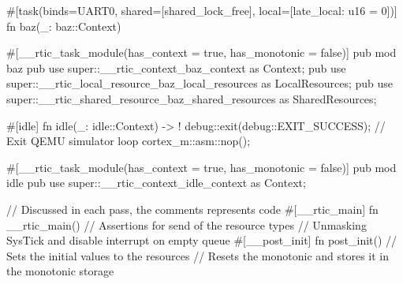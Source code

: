 {    #[task(binds=UART0, shared=[shared_lock_free], local=[late_local: u16 = 0])]
    fn baz(_: baz::Context){
    }
    
    #[__rtic_task_module(has_context = true, has_monotonic = false)]
    pub mod baz {
        pub use super::__rtic_context_baz_context as Context;
        pub use super::__rtic_local_resource_baz_local_resources as LocalResources;
        pub use super::__rtic_shared_resource_baz_shared_resources as SharedResources;
    }

    #[idle]
    fn idle(_: idle::Context) -> ! {
        debug::exit(debug::EXIT_SUCCESS); // Exit QEMU simulator
        loop {
            cortex_m::asm::nop();
        }
    }

    #[__rtic_task_module(has_context = true, has_monotonic = false)]
    pub mod idle {
        pub use super::__rtic_context_idle_context as Context;
    }

    // Discussed in each pass, the comments represents code
    #[__rtic_main]
    fn __rtic_main() {
        // Assertions for send of the resource types
        // Unmasking SysTick and disable interrupt on empty queue
        #[__post_init]
        fn post_init() {
            // Sets the initial values to the resources
            // Resets the monotonic and stores it in the monotonic storage
        }
    }
}
